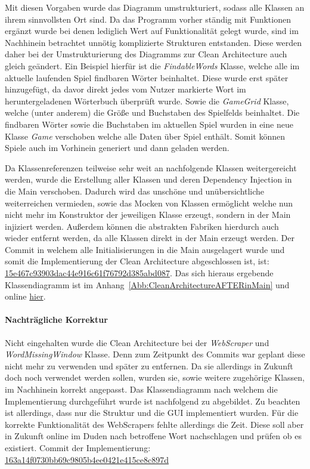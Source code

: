 Mit diesen Vorgaben wurde das Diagramm umstrukturiert, sodass alle Klassen an ihrem sinnvollsten Ort sind. Da das Programm vorher ständig mit Funktionen ergänzt wurde bei denen lediglich Wert auf Funktionalität gelegt wurde, sind im Nachhinein betrachtet unnötig komplizierte Strukturen entstanden. Diese werden daher bei der Umstrukturierung des Diagramms zur Clean Architecture auch gleich geändert. 
Ein Beispiel hierfür ist die \textit{FindableWords} Klasse, welche alle im aktuelle laufenden Spiel findbaren Wörter beinhaltet. Diese wurde erst später hinzugefügt, da davor direkt jedes vom Nutzer markierte Wort im heruntergeladenen Wörterbuch überprüft wurde. Sowie die \textit{GameGrid} Klasse, welche (unter anderem) die Größe und Buchstaben des Spielfelds beinhaltet. Die findbaren Wörter sowie die Buchstaben im aktuellen Spiel wurden in eine neue Klasse \textit{Game} verschoben welche alle Daten über Spiel enthält. Somit können Spiele auch im Vorhinein generiert und dann geladen werden.


Da Klassenreferenzen teilweise sehr weit an nachfolgende Klassen \glqq weitergereicht\grqq{} werden, wurde die Erstellung aller Klassen und deren Dependency Injection in die Main verschoben. Dadurch wird das unschöne und unübersichtliche weiterreichen vermieden, sowie das Mocken von Klassen ermöglicht welche nun nicht mehr im Konstruktor der jeweiligen Klasse erzeugt, sondern in der Main injiziert werden. Außerdem können die abstrakten Fabriken hierdurch auch wieder entfernt werden, da alle Klassen direkt in der Main erzeugt werden. Der Commit in welchem alle Initialisierungen in die Main ausgelagert wurde und somit die Implementierung der Clean Architecture abgeschlossen ist, ist: \href{https://github.com/EinToni/Wortfinder/commit/15e467c93903dac44e916c61f76792d385abd087}{15e467c93903dac44e916c61f76792d385abd087}. Das sich hieraus ergebende Klassendiagramm ist im Anhang~\ref{Abb:CleanArchitectureAFTERinMain} und online \href{https://github.com/EinToni/WortfinderDoku/blob/main/Bilder/CleanArchitectureAFTERinMain.png}{hier}.


\paragraph{Nachträgliche Korrektur}
Nicht eingehalten wurde die Clean Architecture bei der \textit{WebScraper} und \textit{WordMissingWindow} Klasse. Denn zum Zeitpunkt des Commits war geplant diese nicht mehr zu verwenden und später zu entfernen. Da sie allerdings in Zukunft doch noch verwendet werden sollen, wurden sie, sowie weitere zugehörige Klassen, im Nachhinein korrekt angepasst. Das Klassendiagramm nach welchem die Implementierung durchgeführt wurde ist nachfolgend zu abgebildet. Zu beachten ist allerdings, dass nur die Struktur und die GUI implementiert wurden. Für die korrekte Funktionalität des WebScrapers fehlte allerdings die Zeit. Diese soll aber in Zukunft online im Duden nach betroffene Wort nachschlagen und prüfen ob es existiert. Commit der Implementierung: \href{https://github.com/EinToni/Wortfinder/commit/163a14f0730bb69c9805b4ee0421e415ce8c897d}{163a14f0730bb69c9805b4ee0421e415ce8c897d}

